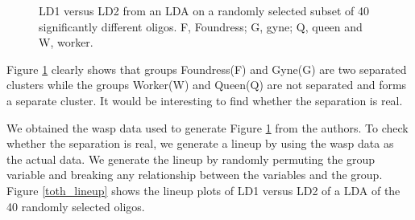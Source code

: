 \documentclass[12]{report}
\begin{document}
\begin{figure}[hbtp]
   \centering
       \caption{LD1 versus LD2 from an LDA on a randomly selected subset of 40 significantly different oligos. F, Foundress; G, gyne; Q, queen and W, worker.}
     \label{oligo}
\end{figure}  

Figure \ref{oligo} clearly shows that groups Foundress(F) and Gyne(G) are two separated clusters while the groups Worker(W) and Queen(Q) are not separated and forms a separate cluster. It would be interesting to find whether the separation is real.

We obtained the wasp data used to generate Figure \ref{oligo} from the authors. To check whether the separation is real, we generate a lineup by using the wasp data as the actual data. We generate the lineup by randomly permuting the group variable and breaking any relationship between the variables  and the group. Figure \ref{toth_lineup} shows the lineup plots of LD1 versus LD2 of a LDA of the 40 randomly selected oligos.
\end{document}
